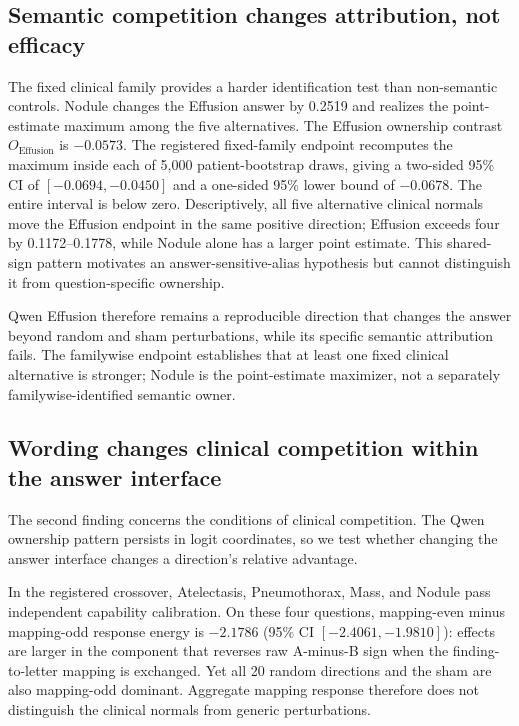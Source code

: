 \subsection{Semantic competition changes attribution, not efficacy}
\label{sec:specificity-results}

The fixed clinical family provides a harder identification test than non-semantic controls. Nodule changes the Effusion answer by 0.2519 and realizes the point-estimate maximum among the five alternatives. The Effusion ownership contrast $O_{\mathrm{Effusion}}$ is $-0.0573$. The registered fixed-family endpoint recomputes the maximum inside each of 5,000 patient-bootstrap draws, giving a two-sided 95\% CI of $[-0.0694,-0.0450]$ and a one-sided 95\% lower bound of $-0.0678$. The entire interval is below zero. Descriptively, all five alternative clinical normals move the Effusion endpoint in the same positive direction; Effusion exceeds four by 0.1172--0.1778, while Nodule alone has a larger point estimate. This shared-sign pattern motivates an answer-sensitive-alias hypothesis but cannot distinguish it from question-specific ownership.

Qwen Effusion therefore remains a reproducible direction that changes the answer beyond random and sham perturbations, while its specific semantic attribution fails. The familywise endpoint establishes that at least one fixed clinical alternative is stronger; Nodule is the point-estimate maximizer, not a separately familywise-identified semantic owner.

\subsection{Wording changes clinical competition within the answer interface}
\label{sec:encoding-results}

The second finding concerns the conditions of clinical competition. The Qwen ownership pattern persists in logit coordinates, so we test whether changing the answer interface changes a direction's relative advantage.

In the registered crossover, Atelectasis, Pneumothorax, Mass, and Nodule pass independent capability calibration. On these four questions, mapping-even minus mapping-odd response energy is $-2.1786$ (95\% CI $[-2.4061,-1.9810]$): effects are larger in the component that reverses raw A-minus-B sign when the finding-to-letter mapping is exchanged. Yet all 20 random directions and the sham are also mapping-odd dominant. Aggregate mapping response therefore does not distinguish the clinical normals from generic perturbations.

